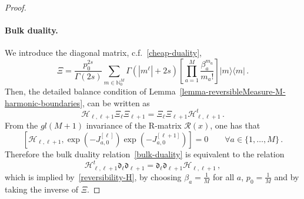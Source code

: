 \documentclass[11pt]{article}
\numberwithin{equation}{section}
\newcommand{\M}{M}
\newcommand{\eR}{\mathcal{R}}
\newcommand{\eH}{\mathcal{H}}
\newcommand{\eJ}{J}
\begin{document}
\begin{proof}
	\paragraph{Bulk duality.}
We introduce the diagonal matrix, c.f.~\eqref{cheap-duality},
\begin{equation}
    \Xi=\frac{p_{0}^{2s}}{\Gamma(2s)}\sum_{m\in \mathbb{N}_{0}^{\M}}\Gamma(|m^{\ell}|+2s)\left[\prod_{a=1}^{\M}\frac{\beta_{a}^{m_{a}}}{m_{a}!}\right]|m\rangle \langle m|\,.
\end{equation}
Then, the detailed balance condition of  Lemma~\ref{lemma-reversibleMeasure-M-harmonic-boundaries}, can be written as 
\begin{equation}\label{reversibility-H}
    \eH_{\ell,\ell+1}\Xi_{\ell}\Xi_{\ell+1}=\Xi_{\ell}\Xi_{\ell+1}\eH_{\ell,\ell+1}^{t}\,.
\end{equation}
	From the $gl(\M+1)$ invariance of the R-matrix  $\eR(x)$, one has that
	\begin{equation}\label{symmetry-exp-H}
		\left[\eH_{\ell,\ell+1},\exp{\left(-\eJ_{a,0}^{[\ell]}\right)}\exp{\left(-\eJ_{a,0}^{[\ell+1]}\right)}\right]=0\qquad \forall a\in \{1,\ldots,\M\}\,.
	\end{equation}
	Therefore the bulk duality relation~\eqref{bulk-duality} is equivalent to the relation
	\begin{equation}\label{bulk-duality2}
			\eH_{\ell,\ell+1}^{t}\mathfrak{d}_{\ell}\mathfrak{d}_{\ell+1}=\mathfrak{d}_{\ell}\mathfrak{d}_{\ell+1}\eH_{\ell,\ell+1}\,,
		\end{equation}
        which is implied by~\eqref{reversibility-H}, by choosing  $\beta_{a}=\frac{1}{\M}$ for all $a$, $p_{0}=\frac{1}{\M}$ and by taking the inverse of $\Xi$.


\end{proof}
\end{document}
